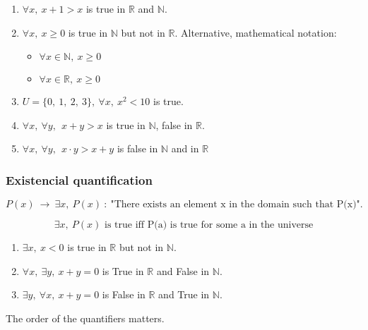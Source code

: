 \documentclass[12pt, a4paper]{book}
\begin{document}
\begin{exmp}
    \begin{enumerate}
        \item $\forall x, \ x+1 > x$ is true in $\mathbb{R}$ and $\mathbb{N}$.
        \item $\forall x, \ x \geq 0$ is true in $\mathbb{N}$ but not in $\mathbb{R}$. Alternative, mathematical notation: 
        \begin{itemize}
            \item $\forall x \in \mathbb{N}, \ x \geq 0$
            \item $\forall x \in \mathbb{R}, \ x \geq 0$
        \end{itemize}
        \item $U= \{0, \ 1, \ 2, \ 3 \}, \ \forall x, \ x^2<10$ is true.
        \item $\forall x, \ \forall y, \ \ x+y>x$ is true in $\mathbb{N}$, false in $\mathbb{R}$.
        \item $\forall x, \ \forall y, \ \ x \cdot y >x+y$ is false in $\mathbb{N}$ and in $\mathbb{R}$
    \end{enumerate}
\end{exmp}

\subsubsection*{Existencial quantification}

$$P(x) \ \rightarrow \ \exists x, \ P(x) \ : \ \text{"There exists an element x in the domain such that P(x)"}.$$

$$\exists x, \ P(x) \text{ is true iff P(a) is true for some a in the universe}$$

\begin{exmp}
    \begin{enumerate}
        \item $\exists x, \ x<0$ is true in $\mathbb{R}$ but not in $\mathbb{N}$.
        \item $\forall x, \ \exists y, \ x+y=0$ is True in $\mathbb{R}$ and False in $\mathbb{N}$.
        \item $\exists y, \ \forall x, \ x+y=0$ is False in $\mathbb{R}$ and True in $\mathbb{N}$.
    \end{enumerate}
\end{exmp}

\begin{rem}
    The order of the quantifiers matters.
\end{rem}
\end{document}
